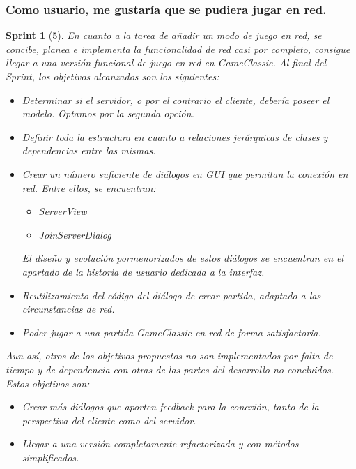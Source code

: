 \documentclass[12pt,a4paper,openright]{book}
\theoremstyle{break}
\newtheorem*{sprint}{Sprint}
\begin{document}
\subsubsection{Como usuario, me gustaría que se pudiera jugar en red.}
\begin{sprint}[5]
En cuanto a la tarea de añadir un modo de juego en red, se concibe, planea e implementa la funcionalidad de red casi por completo, consigue llegar a una versión funcional de juego en red en GameClassic. Al final del Sprint, los objetivos alcanzados son los siguientes:

\begin{itemize}
\item Determinar si el servidor, o por el contrario el cliente, debería poseer el modelo. Optamos por la segunda opción.

\item Definir toda la estructura en cuanto a relaciones jerárquicas de clases y dependencias entre las mismas.

\item Crear un número suficiente de diálogos en GUI que permitan la conexión en red. Entre ellos, se encuentran:
\begin{itemize}
\item ServerView
\item JoinServerDialog
\end{itemize}

El diseño y evolución pormenorizados de estos diálogos se encuentran en el apartado de la historia de usuario dedicada a la interfaz.

\item Reutilizamiento del código del diálogo de crear partida, adaptado a las circunstancias de red.

\item Poder jugar a una partida GameClassic en red de forma satisfactoria.

\end{itemize}

Aun así, otros de los objetivos propuestos no son implementados por falta de tiempo y de dependencia con otras de las partes del desarrollo no concluidos. Estos objetivos son:

\begin{itemize}
\item Crear más diálogos que aporten feedback para la conexión, tanto de la perspectiva del cliente como del servidor.

\item Llegar a una versión completamente refactorizada y con métodos simplificados.


\end{itemize}
\end{sprint}
\end{document}
